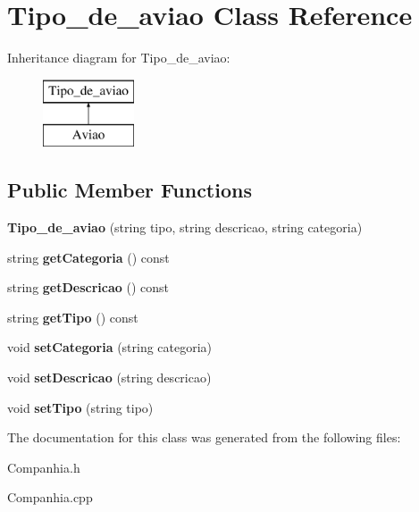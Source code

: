 \hypertarget{class_tipo__de__aviao}{
\section{Tipo\_\-de\_\-aviao Class Reference}
\label{class_tipo__de__aviao}
}
Inheritance diagram for Tipo\_\-de\_\-aviao:\begin{figure}[H]
\begin{center}
\leavevmode
\includegraphics[height=2.000000cm]{class_tipo__de__aviao}
\end{center}
\end{figure}
\subsection*{Public Member Functions}
\begin{DoxyCompactItemize}
\item 
\hypertarget{class_tipo__de__aviao_a57619166dfae6cfc0e7bb24047bfcd84}{
{\bfseries Tipo\_\-de\_\-aviao} (string tipo, string descricao, string categoria)}
\label{class_tipo__de__aviao_a57619166dfae6cfc0e7bb24047bfcd84}

\item 
\hypertarget{class_tipo__de__aviao_af39ff2d2f37fc822d0ba41002fb445f0}{
string {\bfseries getCategoria} () const }
\label{class_tipo__de__aviao_af39ff2d2f37fc822d0ba41002fb445f0}

\item 
\hypertarget{class_tipo__de__aviao_a20919a6f4c5954461343d0856f052c1c}{
string {\bfseries getDescricao} () const }
\label{class_tipo__de__aviao_a20919a6f4c5954461343d0856f052c1c}

\item 
\hypertarget{class_tipo__de__aviao_a66e0cefbc31520ea6348a13c2d0421a7}{
string {\bfseries getTipo} () const }
\label{class_tipo__de__aviao_a66e0cefbc31520ea6348a13c2d0421a7}

\item 
\hypertarget{class_tipo__de__aviao_afdd3c855223da1caf219258d96851113}{
void {\bfseries setCategoria} (string categoria)}
\label{class_tipo__de__aviao_afdd3c855223da1caf219258d96851113}

\item 
\hypertarget{class_tipo__de__aviao_a023cea90b7c2db5faee4a34697c5ceeb}{
void {\bfseries setDescricao} (string descricao)}
\label{class_tipo__de__aviao_a023cea90b7c2db5faee4a34697c5ceeb}

\item 
\hypertarget{class_tipo__de__aviao_af32589bdcb680ae04418f515e5389fd2}{
void {\bfseries setTipo} (string tipo)}
\label{class_tipo__de__aviao_af32589bdcb680ae04418f515e5389fd2}

\end{DoxyCompactItemize}


The documentation for this class was generated from the following files:\begin{DoxyCompactItemize}
\item 
Companhia.h\item 
Companhia.cpp\end{DoxyCompactItemize}
